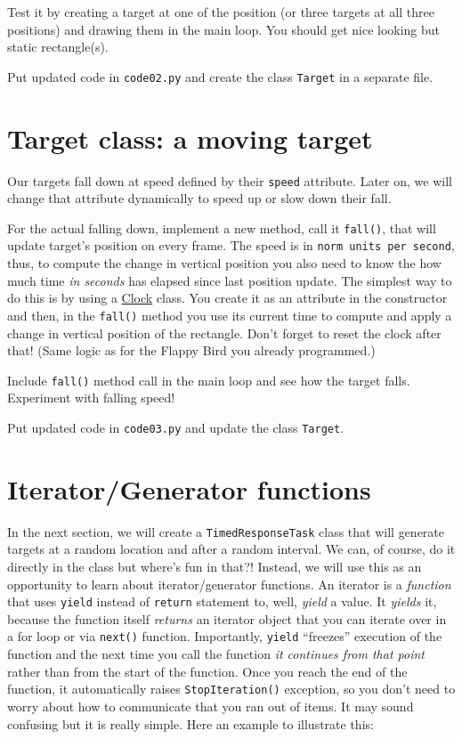 \documentclass[
]{book}
\begin{document}
Test it by creating a target at one of the position (or three targets at all three positions) and drawing them in the main loop. You should get nice looking but static rectangle(s).

Put updated code in \texttt{code02.py} and create the class \texttt{Target} in a separate file.

\hypertarget{target-class-a-moving-target}{%
\section{Target class: a moving target}\label{target-class-a-moving-target}}

Our targets fall down at speed defined by their \texttt{speed} attribute. Later on, we will change that attribute dynamically to speed up or slow down their fall.

For the actual falling down, implement a new method, call it \texttt{fall()}, that will update target's position on every frame. The speed is in \texttt{norm\ units\ per\ second}, thus, to compute the change in vertical position you also need to know the how much time \emph{in seconds} has elapsed since last position update. The simplest way to do this is by using a \href{https://psychopy.org/api/clock.html\#psychopy.clock.Clock}{Clock} class. You create it as an attribute in the constructor and then, in the \texttt{fall()} method you use its current time to compute and apply a change in vertical position of the rectangle. Don't forget to reset the clock after that! (Same logic as for the Flappy Bird you already programmed.)

Include \texttt{fall()} method call in the main loop and see how the target falls. Experiment with falling speed!

Put updated code in \texttt{code03.py} and update the class \texttt{Target}.

\hypertarget{iteratorgenerator-functions}{%
\section{Iterator/Generator functions}\label{iteratorgenerator-functions}}

In the next section, we will create a \texttt{TimedResponseTask} class that will generate targets at a random location and after a random interval. We can, of course, do it directly in the class but where's fun in that?! Instead, we will use this as an opportunity to learn about iterator/generator functions. An iterator is a \emph{function} that uses \texttt{yield} instead of \texttt{return} statement to, well, \emph{yield} a value. It \emph{yields} it, because the function itself \emph{returns} an iterator object that you can iterate over in a for loop or via \texttt{next()} function. Importantly, \texttt{yield} ``freezes'' execution of the function and the next time you call the function \emph{it continues from that point} rather than from the start of the function. Once you reach the end of the function, it automatically raises \texttt{StopIteration()} exception, so you don't need to worry about how to communicate that you ran out of items. It may sound confusing but it is really simple. Here an example to illustrate this:
\end{document}
